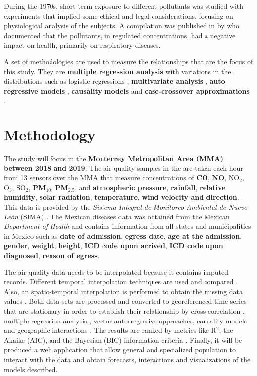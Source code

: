 \documentclass[
  11pt,
  a4paper,
  oneside
]{article}
\begin{document}
During the 1970s, short-term exposure to different pollutants was studied \citep{HackneyEA1975, EhrlichEA1977, HackneyEA1978, LinnEA1978} with experiments that implied some ethical and legal considerations,  focusing on physiological analysis of the subjects. A compilation was published in by \citeauthor{Ferris1978} who documented that the pollutants, in regulated concentrations, had a negative impact on health, primarily on respiratory diseases.

A set of methodologies are used to measure the relationships that are the focus of this study. They are \textbf{multiple regression analysis} \citep{Hyndman2018, Lebowitz1973, hasselblad1978, hatzakisEA1986} with variations in the distributions such as logistic regressions \citep{Korn1979}, \textbf{multivariate analysis} \citep{LaveEA1973, gottinger1983}, \textbf{auto regressive models} \citep{WeiEA1991}, \textbf{causality models} \citep{popescuEA2013} and \textbf{case-crossover approximations} \citep{Maclure1991, carracedoMartinezEA2009}.

\section{Methodology}
The study will focus in the \textbf{Monterrey Metropolitan Area (MMA) between 2018 and 2019}. The air quality samples in the are taken each hour from 13 sensors over the MMA that measure concentrations of \textbf{CO}, \textbf{NO}, \textbf{$\text{NO}_2$}, \textbf{$\text{O}_3$}, \textbf{$\text{SO}_2$}, \textbf{PM$_{10}$}, \textbf{PM$_{2.5}$}, and \textbf{atmospheric pressure}, \textbf{rainfall}, \textbf{relative humidity}, \textbf{solar radiation}, \textbf{temperature}, \textbf{wind velocity and direction}. This data is provided by the \textit{Sistema Integral de Monitoreo Ambiental de Nuevo León} (SIMA) \citep{aireNL}. The Mexican diseases data was obtained from the Mexican \textit{Department of Health} \citep{egresos} and contains information from all states and municipalities in Mexico such as \textbf{date of admission}, \textbf{egress date}, \textbf{age at the admission}, \textbf{gender}, \textbf{weight}, \textbf{height}, \textbf{ICD code upon arrived}, \textbf{ICD code upon diagnosed}, \textbf{reason of egress}.

The air quality data needs to be interpolated because it contains imputed records. Different temporal interpolation techniques are used and compared \citep{Friedman1962}. Also, an spatio-temporal interpolation is performed to obtain the missing data values \citep{LiEA2002}. Both data sets are processed and converted to georeferenced time series \citep{Wei2019} that are stationary \citep{Hyndman2018} in order to establish their relationship by cross correlation \citep{derrickEA2004}, multiple regression analysis \citep{Brockwell2002}, vector autorregresive approaches, causality models \citep{popescuEA2013} and geographic interactions \citep{ComberEA2019}. The results are ranked by metrics like R$^2$, the Akaike (AIC), and the Bayesian (BIC) information criteria \citep{Albert2007}. Finally, it will be produced a web application that allow general and specialized population to interact with the data and obtain forecasts, interactions and visualizations of the models described.
\end{document}
